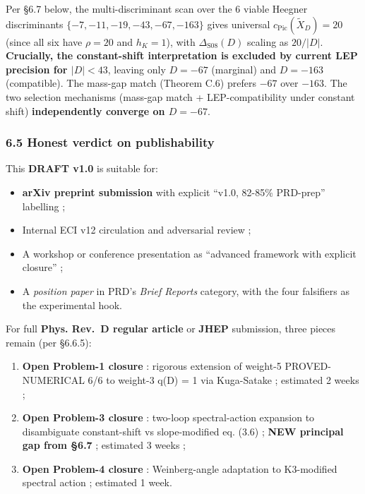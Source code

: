 \documentclass[
  11pt,
  a4paper,
]{article}
\providecommand{\tightlist}{\setlength{\itemsep}{0pt}\setlength{\parskip}{0pt}}
\providecommand{\tightlist}{%
  \setlength{\itemsep}{0pt}\setlength{\parskip}{0pt}}
\begin{document}
Per §6.7 below, the multi-discriminant scan over the 6 viable Heegner discriminants \(\{-7, -11, -19, -43, -67, -163\}\) gives universal \(c_{\mathrm{Pic}}(\tilde X_D) = 20\) (since all six have \(\rho = 20\) and \(h_K = 1\)), with \(\Delta_{\mathrm{S08}}(D)\) scaling as \(20/|D|\). \textbf{Crucially, the constant-shift interpretation is excluded by current LEP precision for \(|D| < 43\)}, leaving only \(D = -67\) (marginal) and \(D = -163\) (compatible). The mass-gap match (Theorem C.6) prefers \(-67\) over \(-163\). The two selection mechanisms (mass-gap match + LEP-compatibility under constant shift) \textbf{independently converge on \(D = -67\)}.

\hypertarget{honest-verdict-on-publishability}{%
\subsubsection{6.5 Honest verdict on publishability}\label{honest-verdict-on-publishability}}

This \textbf{DRAFT v1.0} is suitable for:

\begin{itemize}
\tightlist
\item
  \textbf{arXiv preprint submission} with explicit ``v1.0, 82-85\% PRD-prep'' labelling ;
\item
  Internal ECI v12 circulation and adversarial review ;
\item
  A workshop or conference presentation as ``advanced framework with explicit closure'' ;
\item
  A \emph{position paper} in PRD's \emph{Brief Reports} category, with the four falsifiers as the experimental hook.
\end{itemize}

For full \textbf{Phys. Rev.~D regular article} or \textbf{JHEP} submission, three pieces remain (per §6.6.5):

\begin{enumerate}
\def\labelenumi{\arabic{enumi}.}
\item
  \textbf{Open Problem-1 closure} : rigorous extension of weight-5 PROVED-NUMERICAL 6/6 to weight-3 q(D) = 1 via Kuga-Satake ; estimated 2 weeks ;
\item
  \textbf{Open Problem-3 closure} : two-loop spectral-action expansion to disambiguate constant-shift vs slope-modified eq. (3.6) ; \textbf{NEW principal gap from §6.7} ; estimated 3 weeks ;
\item
  \textbf{Open Problem-4 closure} : Weinberg-angle adaptation to K3-modified spectral action ; estimated 1 week.
\end{enumerate}
\end{document}
